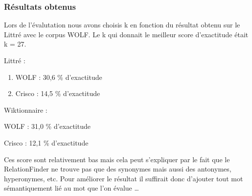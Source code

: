 \subsubsection{Résultats obtenus}

Lors de l'évalutation nous avons choisis k en fonction du résultat obtenu sur 
le Littré avec le corpus WOLF. Le k qui donnait le meilleur score d'exactitude 
était k = 27.

\begin{enumerate}
 \item {Littré :
	\begin{enumerate}
	 \item WOLF : 30,6 \% d'exactitude
	 \item Crisco : 14,5 \% d'exactitude
	\end{enumerate}
	}
 \item {Wiktionnaire :
	\item WOLF : 31,0 \% d'exactitude
	\item Crisco : 12,1 \% d'exactitude
	}
\end{enumerate}

Ces score sont relativement bas mais cela peut s'expliquer par le fait que le 
RelationFinder ne trouve pas que des synonymes mais aussi des antonymes, 
hyperonymes, etc. Pour améliorer le résultat il suffirait donc d'ajouter 
tout mot sémantiquement lié au mot que l'on évalue \dots 

